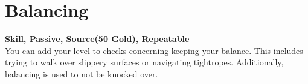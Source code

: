 \section{Balancing}\label{sec:balancing}
\textbf{Skill, Passive, Source(50 Gold), Repeatable}\\
You can add your level to checks concerning keeping your balance. This includes trying to walk over slippery surfaces or navigating tightropes. Additionally, balancing is used to not be knocked over.